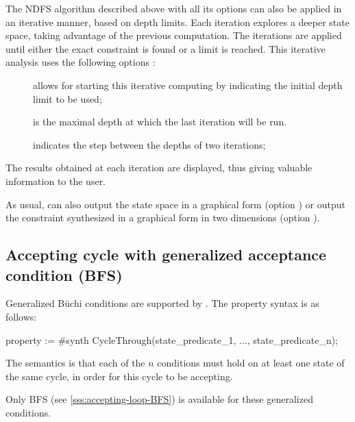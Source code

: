 The NDFS algorithm described above with all its options
can also be applied
in an iterative manner, based on depth limits. Each iteration explores a deeper state
space, taking advantage of the previous computation. The iterations are applied until
either the exact constraint is found or a limit is reached. This iterative analysis
uses the following options :

\begin{description}
	\item[] allows for starting this iterative computing by indicating
	      the initial depth limit to be used;
	\item[] is the maximal depth at which the last iteration
	      will be run.
	\item[] indicates the step between the depths of two iterations;
\end{description}

The results obtained at each iteration are displayed, thus giving valuable information
to the user.

\medskip


As usual, \imitator{} can also
output the state space in a graphical form (option )
or
output the constraint synthesized in a graphical form in two dimensions (option ).



\subsection{Accepting cycle with generalized acceptance condition (BFS)}\label{sss:generalized-accepting-loop-BFS}

Generalized Büchi conditions are supported by \imitator{}.
The property syntax is as follows:

\begin{IMITATORproperty}
property := #synth CycleThrough(state_predicate_1, ..., state_predicate_n);
\end{IMITATORproperty}

The semantics is that each of the $n$ conditions must hold on at least one state of the same cycle, in order for this cycle to be accepting.

\begin{remark}
	Only BFS (see \cref{sss:accepting-loop-BFS}) is available for these generalized conditions.
\end{remark}


